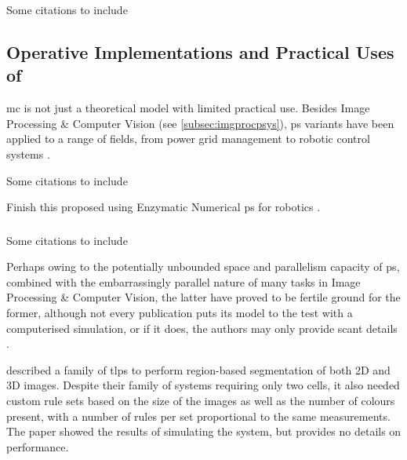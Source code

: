 \begin{anfxwarning}{Some citations to include}
\cite{Raghavan2020,Raghavan2020a,Raghavan2016}
\end{anfxwarning}

\subsection{\label{sec:psystemsuses}Operative Implementations and Practical Uses of }
\Gls{mc} is not just a theoretical model with limited practical use.  Besides Image Processing \& Computer Vision (see \vref{subsec:imgprocpsys}), \gls{ps} variants have been applied to a range of fields, from power grid management to robotic control systems \cite{Zhang2017}.

\begin{anfxwarning}{Some citations to include}
\cite{Zhang2020,Colomer2010,Gheorghe2010,Liu2016,Huang2016,Perez-Hurtado2010,Verlan2012,Syropoulos2004,Liu2020,Lefticaru2011,Oltean2008}
\end{anfxwarning}

\begin{anfxerror}{Finish this}
\citeauthor{Florea2017} proposed using Enzymatic Numerical \gls{ps} for robotics \cite{Florea2017,Florea2016,Florea2017a,Florea2019,Florea2016a}.
\end{anfxerror}

\subsubsection{\label{subsec:imgprocpsys}}
\begin{anfxwarning}{Some citations to include}
\cite{Zhang2012,Yuan2019}
\end{anfxwarning}

Perhaps owing to the potentially unbounded space and parallelism capacity of \gls{ps}, combined with the embarrassingly parallel nature of many tasks in Image Processing \& Computer Vision, the latter have proved to be fertile ground for the former, although not every publication puts its model to the test with a computerised simulation, or if it does, the authors may only provide scant details \cite{Diaz-Pernil2019}.

\citeauthor{Christinal2011} \cite{Christinal2011} described a family of \gls{tlps} to perform region-based segmentation of both 2D and 3D images.  Despite their family of systems requiring only two cells, it also needed custom rule sets based on the size of the images as well as the number of colours present, with a number of rules per set proportional to the same measurements.  The paper showed the results of simulating the system, but provides no details on performance.

